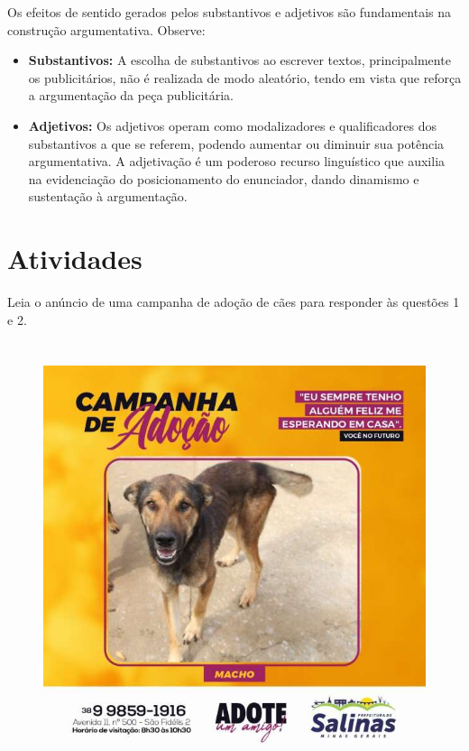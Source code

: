 {Os efeitos de sentido gerados pelos substantivos e adjetivos são
fundamentais na construção argumentativa. Observe:

\begin{itemize}
\item
  \textbf{Substantivos:} A escolha de substantivos ao escrever textos,
  principalmente os publicitários, não é realizada de modo aleatório,
  tendo em vista que reforça a argumentação da peça publicitária.
\item
  \textbf{Adjetivos:} Os adjetivos operam como modalizadores e
  qualificadores dos substantivos a que se referem, podendo aumentar ou
  diminuir sua potência argumentativa. A adjetivação é um poderoso
  recurso linguístico que auxilia na evidenciação do posicionamento do
  enunciador, dando dinamismo e sustentação à argumentação.
\end{itemize}
}

\section{Atividades}

Leia o anúncio de uma campanha de adoção de cães para responder às
questões 1 e 2.


\begin{figure}
\centering
\includegraphics[width=4.96806in,height=4.96806in]{./_SAEB_9_POR/media/image19.jpeg}
\caption{}
\end{figure}

